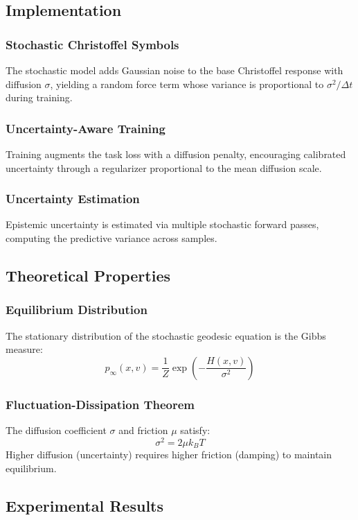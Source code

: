 \documentclass{article}
\numberwithin{equation}{section}
\begin{document}
\subsection{Implementation}
\subsubsection{Stochastic Christoffel Symbols}
The stochastic model adds Gaussian noise to the base Christoffel response with diffusion $\sigma$, yielding a random force term whose variance is proportional to $\sigma^2/\Delta t$ during training.

\subsubsection{Uncertainty-Aware Training}
Training augments the task loss with a diffusion penalty, encouraging calibrated uncertainty through a regularizer proportional to the mean diffusion scale.

\subsubsection{Uncertainty Estimation}
Epistemic uncertainty is estimated via multiple stochastic forward passes, computing the predictive variance across samples.

\subsection{Theoretical Properties}
\subsubsection{Equilibrium Distribution}
The stationary distribution of the stochastic geodesic equation is the Gibbs measure:
\[
p_\infty(x, v) = \frac{1}{Z}\exp\!\left(-\frac{H(x, v)}{\sigma^2}\right)
\]

\subsubsection{Fluctuation-Dissipation Theorem}
The diffusion coefficient $\sigma$ and friction $\mu$ satisfy:
\[
\sigma^2 = 2\mu k_B T
\]
Higher diffusion (uncertainty) requires higher friction (damping) to maintain equilibrium.

\subsection{Experimental Results}
\end{document}
